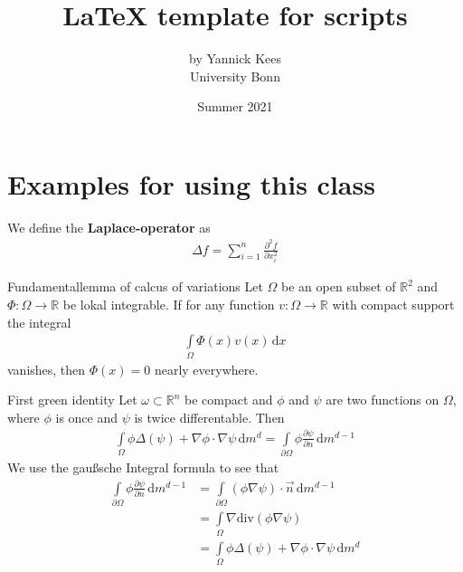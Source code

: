 \documentclass{yannick}
\title{LaTeX template for scripts }
\author{by Yannick Kees \\  {\small University Bonn}}
\date{Summer 2021 }
\begin{document}
\maketitle
\newpage

	\section{Examples for using this class}
	\begin{dfn}
		We define the \textbf{Laplace-operator} as
			\begin{align*}
				\Delta f = \sum_{i=1}^n \frac{\partial^2 f}{\partial x_i^2}
			\end{align*}
	\end{dfn}

	\begin{satznb}{Fundamentallemma of calcus of variations}
		Let $\Omega$ be an open subset of $\mathbb{R}^2$ and $\Phi:\Omega\to\mathbb{R}$ be lokal integrable. If for any function $v:\Omega\to\mathbb{R}$ with compact support the integral 
		\begin{align*}
			\int\limits_{\Omega} \Phi(x)v(x)\,\mathrm{d}x
		\end{align*}
		vanishes, then $\Phi(x) = 0$ nearly everywhere.
	\end{satznb}

	\begin{satzn}{First green identity}
		{
			Let $\omega\subset \mathbb{R}^n$ be compact and $\phi$ and $\psi$ are two functions on $\Omega$, where $\phi$ is once and $\psi$ is twice differentable. Then
			\begin{align*}
				\int\limits_\Omega \phi \Delta(\psi)+\nabla\phi\cdot\nabla\psi\,\mathrm{d}m^d = \int\limits_{\partial \Omega}\phi \frac{\partial \psi}{\partial n}\,\mathrm{d}m^{d-1}
			\end{align*}
		}
		We use the gaußsche Integral formula to see that
		\begin{align*}
		 	\int\limits_{\partial \Omega}\phi \frac{\partial \psi}{\partial n}\,\mathrm{d}m^{d-1}&=  \int\limits_{\partial \Omega}(\phi\nabla\psi)\cdot \vec{n}\,\mathrm{d}m^{d-1}\\
		 	&= \int\limits_\Omega \nabla\mathrm{div}(\phi\nabla\psi)\\
		 	&= \int\limits_\Omega \phi \Delta(\psi)+\nabla\phi\cdot\nabla\psi\,\mathrm{d}m^d
		\end{align*}
	\end{satzn}
	
\end{document}
